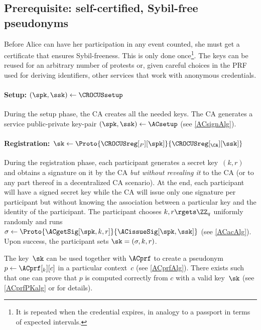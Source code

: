\subsection{Prerequisite: self-certified, Sybil-free pseudonyms}%
\label{ProtocolSetup}

Before Alice can have her participation in any event counted, she must get a 
certificate that ensures Sybil-freeness.
This is only done once\footnote{%
  It is repeated when the credential expires, in analogy to a passport in terms 
  of expected intervals.
}.
The keys can be reused for an arbitrary number of protests or, given
careful choices in the \ac{PRF} used for deriving identifiers, other
services that work with anonymous credentials.

\paragraph*{Setup: \((\spk, \ssk)\gets \CROCUSsetup\)}

During the setup phase, the \ac{CA} creates all the needed keys.
The \ac{CA} generates a service public-private key-pair \((\spk, \ssk)\gets 
  \ACsetup\) (see \cref{ACsignAlg}).

\paragraph*{Registration: \(\sk\gets 
\Proto{\CROCUSreg[_P][\spk]}{\CROCUSreg[_{\CA}][\ssk]}\)}

During the registration phase, each participant
generates a secret key~\((k, r)\) and
obtains a signature on it by the \ac{CA} \emph{but without revealing it} to the 
\ac{CA} (or to any part thereof in a decentralized \ac{CA} scenario).
At the end, each participant will have a signed secret key while the \ac{CA} 
will issue only one signature per participant but without knowing the 
association between a particular key and the identity of the participant.
The participant chooses \(k, r\rgets \ZZ_q\) uniformly randomly and runs 
\(\sigma \gets \Proto{\ACgetSig[\spk, k, r]}{\ACissueSig[\spk, \ssk]}\) (see 
\cref{ACacAlg}).
Upon success, the participant sets \(\sk = (\sigma, k, r)\).

The key~\(\sk\) can be used together with \(\ACprf\) to create a 
pseudonym~\(p\gets \ACprf[_k][c]\) in a particular context~\(c\) (see 
\cref{ACprfAlg}).
There exists  such that one can prove that \(p\) is computed correctly 
from \(c\) with a valid key~\(\sk\) (see \cref{ACprfPKalg} or \cite{AnonPass} 
for details).



